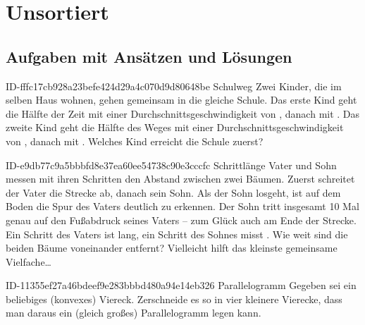 \setcounter{chapter}{-1}
\chapter{Unsortiert}

\section{Aufgaben mit Ansätzen und Lösungen}

\begin{exercise}
      {ID-fffc17cb928a23befe424d29a4c070d9d80648be}
      {Schulweg}
  \ifproblem\problem
    Zwei Kinder, die im selben Haus wohnen, gehen gemeinsam in die gleiche
    Schule. Das erste Kind geht die Hälfte der Zeit mit einer
    Durchschnittsgeschwindigkeit von , danach mit . Das
    zweite Kind geht die Hälfte des Weges mit einer Durchschnittsgeschwindigkeit
    von , danach mit . Welches Kind erreicht die Schule
    zuerst?
  \fi
\end{exercise}

\begin{exercise}
      {ID-e9db77c9a5bbbfd8e37ea60ee54738c90e3cccfc}
      {Schrittlänge}
  \ifproblem\problem
    Vater und Sohn messen mit ihren Schritten den Abstand zwischen zwei Bäumen.
    Zuerst schreitet der Vater die Strecke ab, danach sein Sohn. Als der Sohn
    losgeht, ist auf dem Boden die Spur des Vaters deutlich zu erkennen.
    Der Sohn tritt insgesamt 10 Mal genau auf den Fußabdruck seines Vaters --
    zum Glück auch am Ende der Strecke. Ein Schritt des Vaters ist 
    lang, ein Schritt des Sohnes misst . Wie weit sind die beiden
    Bäume voneinander entfernt?
  \fi
  \ifoutline\outline
    Vielleicht hilft das kleinste gemeinsame Vielfache\ldots
  \fi
\end{exercise}

\begin{exercise}
      {ID-11355ef27a46bdeef9e283bbbd480a94e14eb326}
      {Parallelogramm}
  \ifproblem\problem
    Gegeben sei ein beliebiges (konvexes) Viereck. Zerschneide es so in vier
    kleinere Vierecke, dass man daraus ein (gleich großes) Parallelogramm legen
    kann.
  \fi
\end{exercise}

